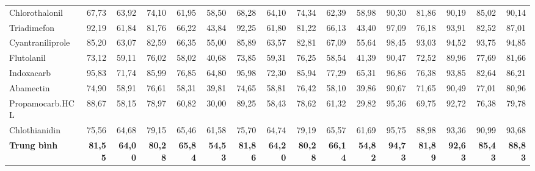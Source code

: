 \documentclass[10pt,twocolumn,twoside]{article}
\begin{document}
\begin{table}[htbp]
{\begin{tabular}{|l|rrrrr|rrrrr|rrrrr|}
Chlorothalonil & 67,73 & 63,92 & 74,10 & 61,95 & 58,50 & 68,28 & 64,10 & 74,34 & 62,39 & 58,98 & 90,30 & 81,86 & 90,19 & 85,02 & 90,14 \\
Triadimefon & 92,19 & 61,84 & 81,76 & 66,22 & 43,84 & 92,25 & 61,80 & 81,22 & 66,13 & 43,40 & 97,09 & 76,18 & 93,91 & 82,52 & 87,01 \\
Cyantraniliprole & 85,20 & 63,07 & 82,59 & 66,35 & 55,00 & 85,89 & 63,57 & 82,81 & 67,09 & 55,64 & 98,45 & 93,03 & 94,52 & 93,75 & 94,85 \\
Flutolanil & 73,12 & 59,11 & 76,02 & 58,02 & 40,68 & 73,85 & 59,31 & 76,25 & 58,54 & 41,39 & 90,47 & 72,52 & 89,96 & 77,69 & 81,66 \\
Indoxacarb & 95,83 & 71,74 & 85,99 & 76,85 & 64,80 & 95,98 & 72,30 & 85,94 & 77,29 & 65,31 & 96,86 & 76,38 & 93,85 & 82,64 & 86,21 \\
Abamectin & 74,90 & 58,91 & 76,61 & 58,31 & 39,81 & 74,65 & 58,81 & 76,42 & 58,10 & 39,86 & 90,67 & 71,65 & 90,49 & 77,01 & 80,96 \\
Propamocarb.HCL & 88,67 & 58,15 & 78,97 & 60,82 & 30,00 & 89,25 & 58,43 & 78,62 & 61,32 & 29,82 & 95,36 & 69,75 & 92,72 & 76,38 & 79,78 \\
Chlothianidin & 75,56 & 64,68 & 79,15 & 65,46 & 61,58 & 75,70 & 64,74 & 79,19 & 65,57 & 61,69 & 95,75 & 88,98 & 93,36 & 90,99 & 93,68 \\
\hline
\textbf{Trung bình} & \textbf{81,55} & \textbf{64,00} & \textbf{80,28} & \textbf{65,84} & \textbf{54,53} & \textbf{81,86} & \textbf{64,20} & \textbf{80,28} & \textbf{66,14} & \textbf{54,82} & \textbf{94,73} & \textbf{81,89} & \textbf{92,63} & \textbf{85,43} & \textbf{88,83} \\
\hline
\end{tabular}%
}
\end{table}
\end{document}
